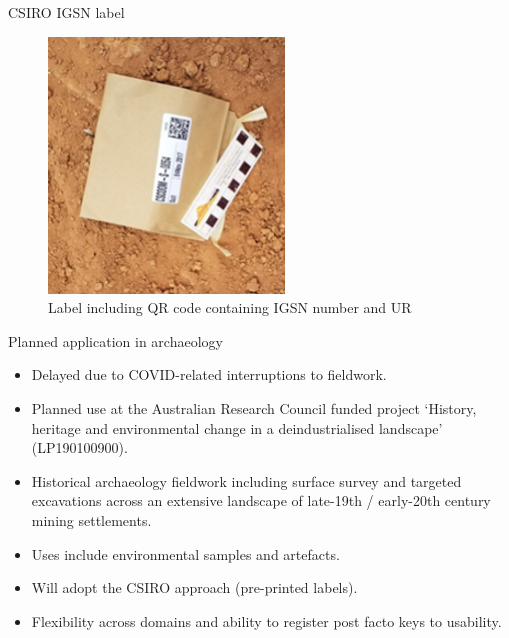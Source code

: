 \begin{frame}{CSIRO IGSN label}
 \begin{figure}[SI]
    \centering
    \vspace{-0.5cm}
        \includegraphics[height=.70\textheight]{figures/CSIRO-IGSN.png}
        \caption{Label including QR code containing IGSN number and UR}
        \label{fig:CSIRO IGSN label}
 \end{figure}
\end{frame}


\begin{frame}{Planned application in archaeology}
    \begin{itemize}
        \item Delayed due to COVID-related interruptions to fieldwork.
        \item Planned use at the Australian Research Council funded project ‘History, heritage and environmental change in a deindustrialised landscape’ (LP190100900).
        \item Historical archaeology fieldwork including surface survey and targeted excavations across an extensive landscape of late-19th / early-20th century mining settlements.
        \item Uses include environmental samples and artefacts.
        \item Will adopt the CSIRO approach (pre-printed labels).
        \item Flexibility across domains and ability to register post facto keys to usability.
    \end{itemize}
\end{frame}


